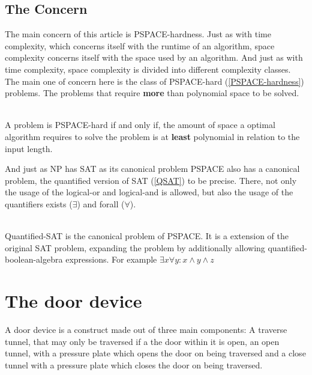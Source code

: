 \documentclass[runningheads]{llncs}
\begin{document}
\subsection{The Concern}
The main concern of this article is PSPACE-hardness. Just as with time complexity, which
concerns itself with the runtime of an algorithm, space complexity concerns itself with the
space used by an algorithm. And just as with time complexity, space complexity is divided
into different complexity classes. The main one of concern here is the class of PSPACE-hard
(\ref{PSPACE-hardness}) problems. The problems that require \textbf{more} than polynomial
space to be solved.
\begin{definition}\label{PSPACE-hardness}\\
  A problem is PSPACE-hard if and only if, the amount of space a optimal algorithm requires to
  solve the problem is at \textbf{least} polynomial in relation to the input length.
\end{definition}
And just as NP has SAT as its canonical problem PSPACE also has a canonical problem, the
quantified version of SAT (\ref{QSAT}) to be precise. There, not only the usage of the
logical-or and logical-and is allowed, but also the usage of the quantifiers exists
($\exists$) and forall
($\forall$).
\begin{definition}\label{QSAT}\\
  Quantified-SAT is the canonical problem of PSPACE. It is a extension of the original SAT
  problem, expanding the problem by additionally allowing quantified-boolean-algebra
  expressions. For example
  $ \exists x \forall y: x \land y \land z $
\end{definition}
\section{The door device}
A door device is a construct made out of three main components: A traverse tunnel, that may
only be traversed if a the door within it is open, an open tunnel, with a pressure plate which
opens the door on being traversed and a close tunnel with a pressure plate which closes the
door on being traversed.
\end{document}
